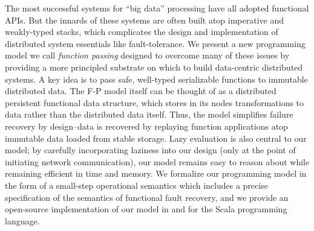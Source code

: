 The most successful systems for ``big data'' processing have all adopted
functional APIs. But the innards of these systems are often built atop
imperative and weakly-typed stacks, which complicates the design and
implementation of distributed system essentials like fault-tolerance. We
present a new programming model we call  {\em function passing} designed to
overcome many of these issues by providing a more principled substrate on which
to build data-centric distributed systems. A key idea is to pass safe,
well-typed serializable functions to immutable distributed data. The F-P model
itself can be thought of as a distributed persistent functional data structure,
which stores in its nodes transformations to data rather than the distributed
data itself.  Thus, the model simplifies failure recovery by design--data is
recovered by replaying function applications atop immutable data loaded from
stable storage. Lazy evaluation is also central to our model; by carefully
incorporating laziness into our design (only at the point of initiating network
communication), our model remains easy to reason about while remaining
efficient in time and memory. We formalize our programming model in the form of
a small-step operational semantics which includes a precise specification of
the semantics of functional fault recovery, and we provide an open-source
implementation of our model in and for the Scala programming language. 










